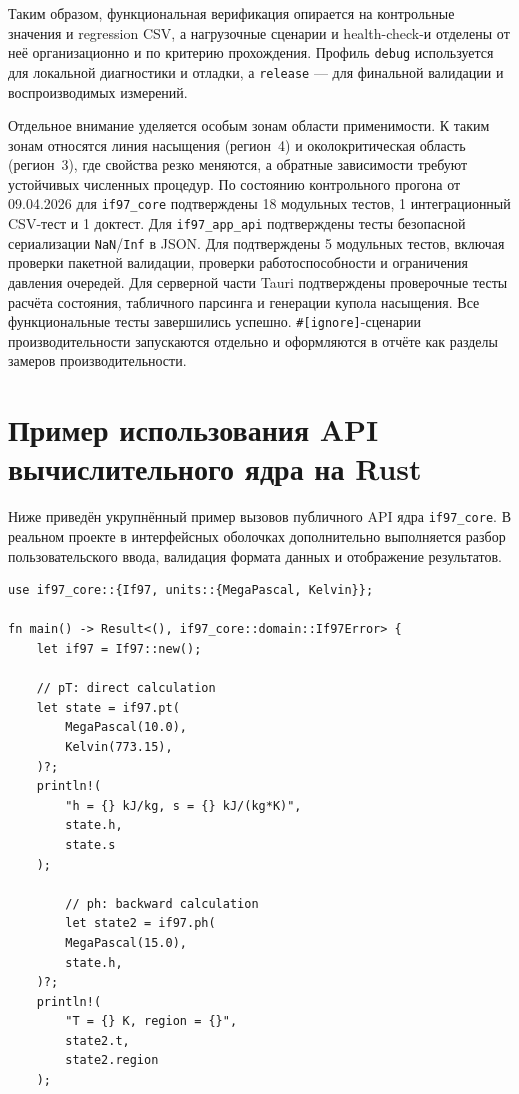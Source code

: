\begin{appendices}
Таким образом, функциональная верификация опирается на контрольные значения и regression CSV, а нагрузочные сценарии и health-check-и отделены от неё организационно и по критерию прохождения.
Профиль \texttt{debug} используется для локальной диагностики и отладки, а \texttt{release} --- для финальной валидации и воспроизводимых измерений.

Отдельное внимание уделяется особым зонам области применимости.  
К таким зонам относятся линия насыщения (регион~4) и околокритическая область (регион~3), где свойства резко меняются, а обратные зависимости требуют устойчивых численных процедур.  
По состоянию контрольного прогона от 09.04.2026
для \texttt{if97\_core} подтверждены
18 модульных тестов, 1 интеграционный CSV-тест и 1 доктест.
Для \texttt{if97\_app\_api}
подтверждены тесты безопасной сериализации
\texttt{NaN}/\texttt{Inf} в JSON.
Для 
подтверждены 5 модульных тестов,
включая проверки пакетной валидации, проверки работоспособности и ограничения давления очередей.
Для серверной части Tauri
подтверждены проверочные тесты
расчёта состояния, табличного парсинга
и генерации купола насыщения.
Все функциональные тесты завершились успешно.
	\texttt{\#[ignore]}-сценарии производительности
	запускаются отдельно и оформляются в отчёте как разделы замеров производительности.

\section{Пример использования API вычислительного ядра на Rust}

Ниже приведён укрупнённый пример вызовов публичного API ядра \texttt{if97\_core}.  
В реальном проекте в интерфейсных оболочках дополнительно выполняется разбор пользовательского ввода, валидация формата данных и отображение результатов.  

\begin{verbatim}
use if97_core::{If97, units::{MegaPascal, Kelvin}};

fn main() -> Result<(), if97_core::domain::If97Error> {
    let if97 = If97::new();

    // pT: direct calculation
    let state = if97.pt(
        MegaPascal(10.0),
        Kelvin(773.15),
    )?;
    println!(
        "h = {} kJ/kg, s = {} kJ/(kg*K)",
        state.h,
        state.s
    );

	    // ph: backward calculation
	    let state2 = if97.ph(
        MegaPascal(15.0),
        state.h,
    )?;
    println!(
        "T = {} K, region = {}",
        state2.t,
        state2.region
    );


\end{verbatim}
\end{appendices}
